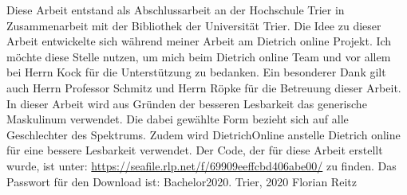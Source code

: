 \preface

Diese Arbeit entstand als Abschlussarbeit an der Hochschule Trier in Zusammenarbeit mit der Bibliothek der Universität Trier. 
\newline
\newline
Die Idee zu dieser Arbeit entwickelte sich während meiner Arbeit am Dietrich online Projekt. Ich möchte diese Stelle nutzen, um mich beim Dietrich online Team und vor allem bei Herrn Kock für die Unterstützung zu bedanken.
\newline
\newline
Ein besonderer Dank gilt auch Herrn Professor Schmitz und Herrn Röpke für die Betreuung dieser Arbeit.
\newline
\newline
In dieser Arbeit wird aus Gründen der besseren Lesbarkeit das generische Maskulinum verwendet. Die dabei gewählte Form bezieht sich auf alle Geschlechter des Spektrums. 
\newline
Zudem wird DietrichOnline anstelle Dietrich online für eine bessere Lesbarkeit verwendet.
\newline
\newline
Der Code, der für diese Arbeit erstellt wurde, ist unter: \url{https://seafile.rlp.net/f/69909eeffcbd406abe00/} zu finden. Das Passwort für den Download ist: Bachelor2020.
\newline
\newline
Trier, 2020
\newline
\noindent Florian Reitz